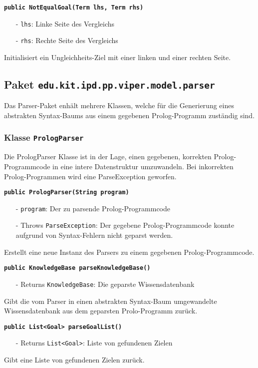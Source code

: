 \documentclass[parskip=full,11pt,twoside]{scrartcl}
\begin{document}
\textbf{\texttt{public NotEqualGoal(Term lhs, Term rhs)}}
\begin{itemize}[noitemsep]
	\item[-] \texttt{lhs}: Linke Seite des Vergleichs
	\item[-] \texttt{rhs}: Rechte Seite des Vergleichs
\end{itemize}
Initialisiert ein Ungleichheits-Ziel mit einer linken und einer rechten Seite.

\newpage
\subsection{Paket \texttt{edu.kit.ipd.pp.viper.model.parser}}

Das Parser-Paket enhält mehrere Klassen, welche für die Generierung eines abstrakten Syntax-Baums aus einem gegebenen Prolog-Programm zuständig sind.

\subsubsection{Klasse \texttt{PrologParser}}

Die PrologParser Klasse ist in der Lage, einen gegebenen, korrekten Prolog-Programmcode in eine intere Datenstruktur umzuwandeln. Bei inkorrekten Prolog-Programmen wird eine ParseException geworfen.

\textbf{\texttt{public PrologParser(String program)}}
\begin{itemize}[noitemsep]
	\item[-] \texttt{program}: Der zu parsende Prolog-Programmcode
	\item[-] Throws \texttt{ParseException}: Der gegebene Prolog-Programmcode konnte aufgrund von Syntax-Fehlern nicht geparst werden.
\end{itemize}
Erstellt eine neue Instanz des Parsers zu einem gegebenen Prolog-Programmcode.

\textbf{\texttt{public KnowledgeBase parseKnowledgeBase()}}
\begin{itemize}[noitemsep]
	\item[-] Returns \texttt{KnowledgeBase}: Die geparste Wissensdatenbank
\end{itemize}
Gibt die vom Parser in einen abstrakten Syntax-Baum umgewandelte Wissensdatenbank aus dem geparsten Prolo-Programm zurück.

\textbf{\texttt{public List<Goal> parseGoalList()}}
\begin{itemize}[noitemsep]
	\item[-] Returns \texttt{List<Goal>}: Liste von gefundenen Zielen
\end{itemize}
Gibt eine Liste von gefundenen Zielen zurück.
\end{document}
